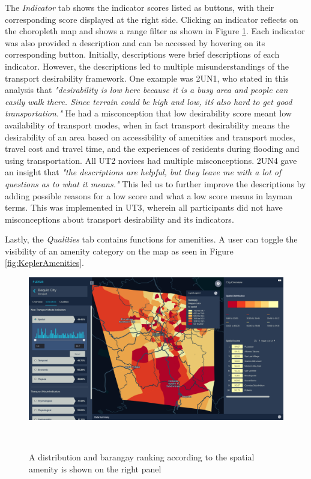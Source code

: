 \documentclass{sigchi}
\begin{document}
The \textit{Indicator} tab shows the indicator scores listed as buttons, with their corresponding score displayed at the right side. Clicking an indicator reflects on the choropleth map and shows a range filter as shown in Figure \ref{fig:KeplerIndicatorActive}. Each indicator was also provided a description and can be accessed by hovering on its corresponding button. Initially, descriptions were brief descriptions of each indicator. However, the descriptions led to multiple misunderstandings of the transport desirability framework. One example was 2UN1, who stated in this analysis that \textit{"desirability is low here because it is a busy area and people can easily walk there. Since terrain could be high and low, it\'s also hard to get good transportation."} He had a misconception that low desirability score meant low availability of transport modes, when in fact transport desirability means the desirability of an area based on accessibility of amenities and transport modes, travel cost and travel time, and the experiences of residents during flooding and using transportation. All UT2 novices had multiple misconceptions. 2UN4 gave an insight that \textit{"the descriptions are helpful, but they leave me with a lot of questions as to what it means."} This led us to further improve the descriptions by adding possible reasons for a low score and what a low score means in layman terms. This was implemented in UT3, wherein all participants did not have misconceptions about transport desirability and its indicators. 

Lastly, the \textit{Qualities} tab contains functions for amenities. A user can toggle the visibility of an amenity category on the map as seen in Figure \ref{fig:KeplerAmenities}.

\begin{figure}
\centering
  \includegraphics[width=0.9\columnwidth]{figures/indicator.PNG}
  \caption{A distribution and barangay ranking according to the spatial amenity is shown on the right panel}~\label{fig:KeplerIndicatorActive}
\end{figure}
\end{document}
